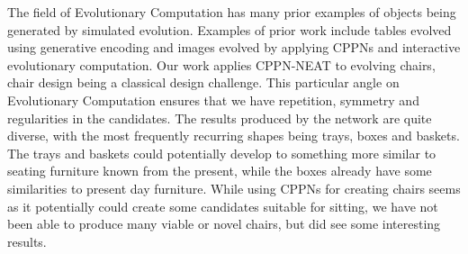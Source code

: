 The field of Evolutionary Computation has many prior examples of objects being
generated by simulated evolution.
Examples of prior work include tables evolved using generative encoding
and images evolved by applying CPPNs and interactive evolutionary computation.
Our work applies CPPN-NEAT to evolving chairs, chair design being a
classical design challenge. This particular angle on Evolutionary Computation
ensures that we have repetition, symmetry and regularities in the candidates.
The results produced by the network are quite diverse, with the most frequently
recurring shapes being trays, boxes and baskets. The trays and baskets could
potentially develop to something more similar to seating furniture known from
the present, while the boxes already have some similarities to present day
furniture. While using CPPNs for creating chairs seems as it potentially could
create some candidates suitable for sitting, we have not been able to produce
many viable or novel chairs, but did see some interesting results.
